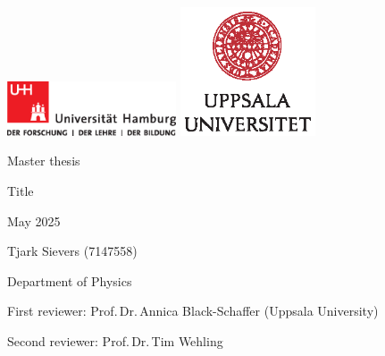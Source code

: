 \documentclass[main.tex]{subfiles}
\begin{document}
\begin{fullsizetitle}
    \vspace{2cm}
    \hspace{0.1\textwidth}
    \vline\hspace{10pt}
    \begin{minipage}[t][0.8\textheight][t]{0.8\textwidth}
        \includegraphics[width=5cm, valign=c]{images/logos/up-uhh-logo-u-2010-u-farbe-u-cmyk}
        \includegraphics[width=4cm, valign=c]{images/logos/UU_logo_CMYK}\par
        \vspace{1\baselineskip}

    \begin{FlushLeft}
        {\Large\textcolor{UHHred}{Master thesis}\par}

        {\Huge Title\par}

       \vspace{1\baselineskip}
       
       May 2025

    \end{FlushLeft}

    \vfill
    
    \begin{FlushLeft}
    	Tjark Sievers (7147558)\par
        Department of Physics\par
        First reviewer: Prof.\,Dr.\,Annica Black-Schaffer (Uppsala University) \par
        Second reviewer: Prof.\,Dr.\,Tim Wehling \par
    \end{FlushLeft}
    \end{minipage}
\end{fullsizetitle}
\end{document}
